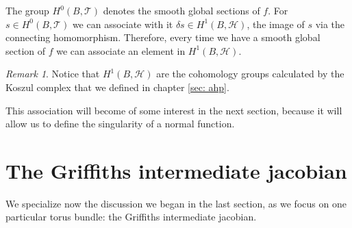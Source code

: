 \documentclass[a4paper,12 pt,titlepage,twoside]{book}
\theoremstyle{plain}
\theoremstyle{theorem}
\theoremstyle{definition}
\theoremstyle{remark}
\newtheorem{oss}[thm]{Remark}
\begin{document}
	The group $H^0(B, \mathcal{T})$ denotes the smooth global sections of $f$. For $s \in H^0(B, \mathcal{T})$ we can associate with it $\delta s \in H^1(B, \mathcal{H})$, the image of $s$ via the connecting homomorphism. Therefore, every time we have a smooth global section of $f$ we can associate an element in $H^1(B, \mathcal{H}).$ 
	\begin{oss}
		Notice that $H^1(B, \mathcal{H})$ are the cohomology groups calculated by the Koszul complex that we defined in chapter \ref{sec: ahp}.
	\end{oss}
	This association will become of some interest in the next section, because it will allow us to define the singularity of a normal function.
	\section{The Griffiths intermediate jacobian}
	We specialize now the discussion we began in the last section, as we focus on one particular torus bundle: the Griffiths intermediate jacobian. 
	
\end{document}
